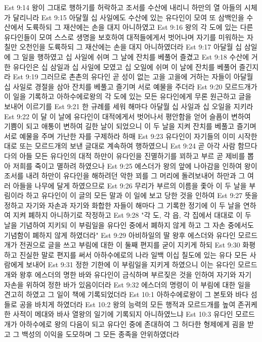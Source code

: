 Est 9:14  왕이 그대로 행하기를 허락하고 조서를 수산에 내리니 하만의 열 아들의 시체가 달리니라
Est 9:15  아달월 십 사일에도 수산에 있는 유다인이 모여 또 삼백인을 수산에서 도륙하되 그 재산에는 손을 대지 아니하였고
Est 9:16  왕의 각 도에 있는 다른 유다인들이 모여 스스로 생명을 보호하여 대적들에게서 벗어나며 자기를 미워하는 자 칠만 오천인을 도륙하되 그 재산에는 손을 대지 아니하였더라
Est 9:17  아달월 십 삼일에 그 일을 행하였고 십 사일에 쉬며 그 날에 잔치를 베풀어 즐겼고
Est 9:18  수산에 거한 유다인은 십 삼일과 십 사일에 모였고 십 오일에 쉬며 이 날에 잔치를 베풀어 즐긴지라
Est 9:19  그러므로 촌촌의 유다인 곧 성이 없는 고을 고을에 거하는 자들이 아달월 십 사일로 경절을 삼아 잔치를 베풀고 즐기며 서로 예물을 주더라
Est 9:20  모르드개가 이 일을 기록하고 아하수에로왕의 각 도에 있는 모든 유다인에게 무론 원근하고 글을 보내어 이르기를
Est 9:21  한 규례를 세워 해마다 아달월 십 사일과 십 오일을 지키라
Est 9:22  이 달 이 날에 유다인이 대적에게서 벗어나서 평안함을 얻어 슬픔이 변하여 기쁨이 되고 애통이 변하여 길한 날이 되었으니 이 두 날을 지켜 잔치를 베풀고 즐기며 서로 예물을 주며 가난한 자를 구제하라 하매
Est 9:23  유다인이 자기들의 이미 시작한대로 또는 모르드개의 보낸 글대로 계속하여 행하였으니
Est 9:24  곧 아각 사람 함므다다의 아들 모든 유다인의 대적 하만이 유다인을 진멸하기를 꾀하고 부르 곧 제비를 뽑아 저희를 죽이고 멸하려 하였으나
Est 9:25  에스더가 왕의 앞에 나아감을 인하여 왕이 조서를 내려 하만이 유다인을 해하려던 악한 꾀를 그 머리에 돌려보내어 하만과 그 여러 아들을 나무에 달게 하였으므로
Est 9:26  무리가 부르의 이름을 좇아 이 두 날을 부림이라 하고 유다인이 이 글의 모든 말과 이 일에 보고 당한 것을 인하여
Est 9:27  뜻을 정하고 자기와 자손과 자기와 화합한 자들이 해마다 그 기록한 정기에 이 두 날을 연하여 지켜 폐하지 아니하기로 작정하고
Est 9:28  "각 도, 각 읍, 각 집에서 대대로 이 두 날을 기념하여 지키되 이 부림일을 유다인 중에서 폐하지 않게 하고 그 자손 중에서도 기념함이 폐하지 않게 하였더라"
Est 9:29  아비하일의 딸 왕후 에스더와 유다인 모르드개가 전권으로 글을 쓰고 부림에 대한 이 둘째 편지를 굳이 지키게 하되
Est 9:30  화평하고 진실한 말로 편지를 써서 아하수에로의 나라 일백 이십 칠도에 있는 유다 모든 사람에게 보내어
Est 9:31  정한 기한에 이 부림일을 지키게 하였으니 이는 유다인 모르드개와 왕후 에스더의 명한 바와 유다인이 금식하며 부르짖은 것을 인하여 자기와 자기 자손을 위하여 정한 바가 있음이더라
Est 9:32  에스더의 명령이 이 부림에 대한 일을 견고히 하였고 그 일이 책에 기록되었더라
Est 10:1  아하수에로왕이 그 본토와 바다 섬들로 공을 바치게 하였더라
Est 10:2  왕의 능력의 모든 행적과 모르드개를 높여 존귀케 한 사적이 메대와 바사 열왕의 일기에 기록되지 아니하였느냐
Est 10:3  유다인 모르드개가 아하수에로 왕의 다음이 되고 유다인 중에 존대하여 그 허다한 형제에게 굄을 받고 그 백성의 이익을 도모하며 그 모든 종족을 안위하였더라


